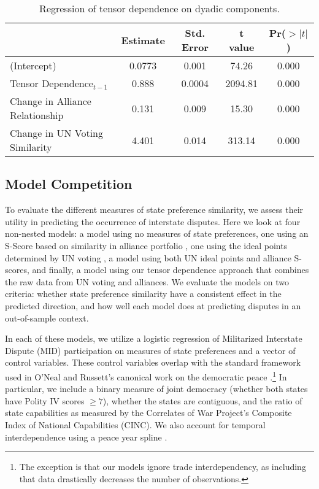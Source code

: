 \begin{table}[ht]
	\centering
	\begin{tabular}{lcccc}
		\hline
		& Estimate & Std. Error & t value & Pr($>|t|$) \\
		\hline
		(Intercept) & 0.0773 & 0.001 & 74.26 & 0.000 \\
		Tensor Dependence$_{t-1}$ & 0.888 & 0.0004 & 2094.81 & 0.000 \\
		Change in Alliance Relationship & 0.131 & 0.009 & 15.30 & 0.000 \\
		Change in UN Voting Similarity & 4.401 & 0.014 & 313.14 & 0.000 \\
		\hline
	\end{tabular}
	\caption{Regression of tensor dependence on dyadic components.}
	\label{tensor:ols}
\end{table}

\subsection*{Model Competition}

To evaluate the different measures of state preference similarity, we assess their utility in predicting the occurrence of interstate disputes. Here we look at four non-nested models: a model using no measures of state preferences, one using an S-Score based on similarity in alliance portfolio \citep{signorino:ritter:1999}, one using the ideal points determined by UN voting \citep{bailey:etal:2015}, a model using both UN ideal points and alliance S-scores, and finally, a model using our tensor dependence approach that combines the raw data from UN voting and alliances. We evaluate the models on two criteria: whether state preference similarity have a consistent effect in the predicted direction, and how well each model does at predicting disputes in an out-of-sample context.

In each of these models, we utilize a logistic regression of Militarized Interstate Dispute (MID) participation on measures of state preferences and a vector of control variables. These control variables overlap with the standard framework used in O'Neal and Russett's canonical work on the democratic peace \citep{oneal:russett:1997}.\footnote{The exception is that our models ignore trade interdependency, as including that data drastically decreases the number of observations.} In particular, we include a binary measure of joint democracy (whether both states have Polity IV scores $\geq 7$), whether the states are contiguous, and the ratio of state capabilities as measured by the Correlates of War Project's Composite Index of National Capabilities (CINC). We also account for temporal interdependence using a peace year spline \citep{carter:signorino:2010}.

